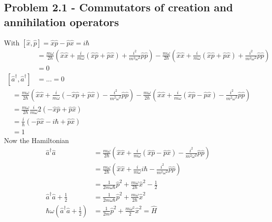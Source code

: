 \documentclass[10pt,a4paper]{book}
\theoremstyle{definition}
\begin{document}
\subsection{Problem 2.1 - Commutators of creation and annihilation operators}
With $[\hat{x},\hat{p}]=\hat{x}\hat{p}-\hat{p}\hat{x}=i\hbar$
\begin{align}
[\hat{a},\hat{a}]
&=\frac{m\omega}{2\hbar}\left(\hat{x}\hat{x}+\frac{i}{m\omega}(\hat{x}\hat{p}+\hat{p}\hat{x})+\frac{i^2}{m^2\omega^2}\hat{p}\hat{p}\right)-\frac{m\omega}{2\hbar}\left(\hat{x}\hat{x}+\frac{i}{m\omega}(\hat{x}\hat{p}+\hat{p}\hat{x})+\frac{i^2}{m^2\omega^2}\hat{p}\hat{p}\right)\\
&=0\\
[\hat{a}^\dagger,\hat{a}^\dagger]
&=...=0
\end{align}
\begin{align}
[\hat{a},\hat{a}^\dagger]
&=\frac{m\omega}{2\hbar}\left(\hat{x}\hat{x}+\frac{i}{m\omega}(-\hat{x}\hat{p}+\hat{p}\hat{x})-\frac{i^2}{m^2\omega^2}\hat{p}\hat{p}\right)-\frac{m\omega}{2\hbar}\left(\hat{x}\hat{x}+\frac{i}{m\omega}(\hat{x}\hat{p}-\hat{p}\hat{x})-\frac{i^2}{m^2\omega^2}\hat{p}\hat{p}\right)\\
&=\frac{m\omega}{2\hbar}\frac{i}{m\omega}2(-\hat{x}\hat{p}+\hat{p}\hat{x})\\
&=\frac{i}{\hbar}(-\hat{p}\hat{x}-i\hbar+\hat{p}\hat{x})\\
&=1
\end{align}
Now the Hamiltonian
\begin{align}
\hat{a}^\dagger\hat{a}
&=\frac{m\omega}{2\hbar}\left(\hat{x}\hat{x}+\frac{i}{m\omega}(\hat{x}\hat{p}-\hat{p}\hat{x})-\frac{i^2}{m^2\omega^2}\hat{p}\hat{p}\right)\\
&=\frac{m\omega}{2\hbar}\left(\hat{x}\hat{x}+\frac{i}{m\omega}i\hbar-\frac{i^2}{m^2\omega^2}\hat{p}\hat{p}\right)\\
&=\frac{1}{2m\omega\hbar}\hat{p}^2+\frac{m\omega}{2\hbar}\hat{x}^2-\frac{1}{2}\\
\hat{a}^\dagger\hat{a}+\frac{1}{2}&=\frac{1}{2m\omega\hbar}\hat{p}^2+\frac{m\omega}{2\hbar}\hat{x}^2\\
\hbar\omega\left(\hat{a}^\dagger\hat{a}+\frac{1}{2}\right)&=\frac{1}{2m}\hat{p}^2+\frac{m\omega^2}{2}\hat{x}^2=\hat{H}
\end{align}
\end{document}
